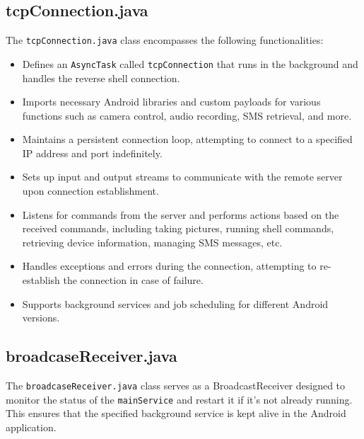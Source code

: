 \documentclass[12pt]{article}
\begin{document}
\subsection{tcpConnection.java}
The \texttt{tcpConnection.java} class encompasses the following functionalities:
\begin{itemize}
    \item Defines an \texttt{AsyncTask} called \texttt{tcpConnection} that runs in the background and handles the reverse shell connection.
    \item Imports necessary Android libraries and custom payloads for various functions such as camera control, audio recording, SMS retrieval, and more.
    \item Maintains a persistent connection loop, attempting to connect to a specified IP address and port indefinitely.
    \item Sets up input and output streams to communicate with the remote server upon connection establishment.
    \item Listens for commands from the server and performs actions based on the received commands, including taking pictures, running shell commands, retrieving device information, managing SMS messages, etc.
    \item Handles exceptions and errors during the connection, attempting to re-establish the connection in case of failure.
    \item Supports background services and job scheduling for different Android versions.
\end{itemize}

\subsection{broadcaseReceiver.java}
The \texttt{broadcaseReceiver.java} class serves as a BroadcastReceiver designed to monitor the status of the \texttt{mainService} and restart it if it's not already running. This ensures that the specified background service is kept alive in the Android application.
\end{document}
